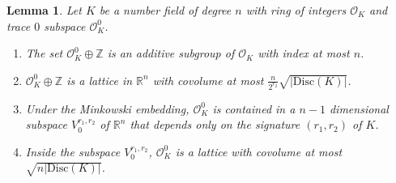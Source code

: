 \documentclass[12pt]{amsart}
\newtheorem{lemma}[theorem]{Lemma}
\theoremstyle{definition} \newtheorem*{notation}{Notation}
\theoremstyle{remark} \newtheorem*{remark}{Remark}
\theoremstyle{remark} \newtheorem*{example}{Example}
\theoremstyle{definition} \newtheorem*{definition}{Definition}
\theoremstyle{definition} \newtheorem*{question}{Question}
\numberwithin{equation}{section}
\numberwithin{theorem}{section}
\begin{document}
	\begin{lemma} \label{lem:trace-0-props}
		Let $K$ be a number field of degree $n$ with ring of integers $\mathcal{O}_K$ and trace $0$ subspace $\mathcal{O}_K^0$.
		
		\begin{enumerate}
			\item The set $\mathcal{O}_K^0 \oplus \mathbb{Z}$ is an additive subgroup of $\mathcal{O}_K$ with index at most $n$.
			\item $\mathcal{O}_K^0 \oplus \mathbb{Z}$ is a lattice in $\mathbb{R}^n$ with covolume at most $\frac{n}{2^{r_2}} \sqrt{|\mathrm{Disc}(K)|}$.
			\item Under the Minkowski embedding, $\mathcal{O}_K^0$ is contained in a $n-1$ dimensional subspace $V_0^{r_1,r_2}$ of $\mathbb{R}^n$ that depends only on the signature $(r_1,r_2)$ of $K$.
			\item Inside the subspace $V_0^{r_1,r_2}$, $\mathcal{O}_K^0$ is a lattice with covolume at most $\sqrt{n |\mathrm{Disc}(K)|}$.
		\end{enumerate}
	\end{lemma}
\end{document}
